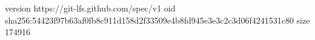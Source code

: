 version https://git-lfs.github.com/spec/v1
oid sha256:54423f97b63af0fb8c911d158d2f33509e4b8fd945e3e3c2c3d06f4241531c80
size 174916
